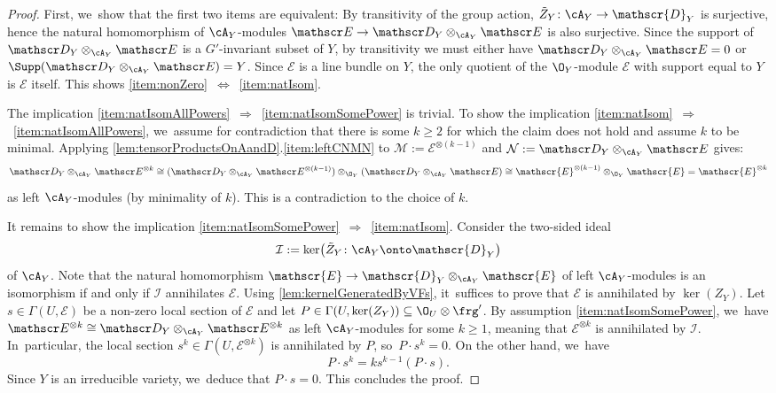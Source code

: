 \begin{proof}
First, we~show that the first two items are equivalent:
By transitivity of the group action, $\tilde Z_Y \colon \cA_Y \to \mathscr{D}_Y$ is surjective, hence the natural homomorphism of $\cA_Y$\nobreakdash-mod\-ules $\mathscr E \to \mathscr D_Y \otimes_{\cA_Y} \mathscr E$ is also surjective. Since the support of $\mathscr D_Y \otimes_{\cA_Y} \mathscr E$ is a $G'$-invariant subset of $Y$, by transitivity we must either have $\mathscr D_Y \otimes_{\cA_Y} \mathscr E = 0$ or $\Supp(\mathscr D_Y \otimes_{\cA_Y} \mathscr E) = Y$. Since $\mathscr E$ is a line bundle on $Y$, the only quotient of the $\O_Y$\nobreakdash-mod\-ule $\mathscr{E}$ with support equal to $Y$ is $\mathscr{E}$ itself. This shows \cref{item:nonZero}~$\Leftrightarrow$~\cref{item:natIsom}.

The implication \cref{item:natIsomAllPowers}~$\Rightarrow$~\cref{item:natIsomSomePower} is trivial. To show the implication \cref{item:natIsom}~$\Rightarrow$~\cref{item:natIsomAllPowers}, we~assume for contradiction that there is some $k \geq 2$ for which the claim does not hold and assume $k$ to be minimal. Applying \cref{lem:tensorProductsOnAandD}.\cref{item:leftCNMN} to $\mathcal M := \mathscr E^{\otimes (k-1)}$ and $\mathcal N := \mathscr D_Y \otimes_{\cA_Y} \mathscr E$ gives:
\[
\mathscr D_Y \otimes_{\cA_Y} \mathscr E^{\otimes k} \cong (\mathscr D_Y \otimes_{\cA_Y} \mathscr E^{\otimes (k-1)}) \otimes_{\O_Y} (\mathscr D_Y \otimes_{\cA_Y} \mathscr E) \cong \mathscr{E}^{\otimes (k-1)} \otimes_{\O_Y} \mathscr{E} = \mathscr{E}^{\otimes k}
\]
as left $\cA_Y$\nobreakdash-mod\-ules (by minimality of $k$). This is a contradiction to the choice of $k$.

It remains to show the implication \cref{item:natIsomSomePower}~$\Rightarrow$~\cref{item:natIsom}. Consider the two-sided ideal
\[
\mathcal I := \ker\bigl(\tilde Z_Y \colon \cA_Y \onto \mathscr{D}_Y\bigr)
\]
of $\cA_Y$.
Note that the natural homomorphism $\mathscr{E} \to \mathscr{D}_Y \otimes_{\cA_Y} \mathscr{E}$ of left $\cA_Y$\nobreakdash-mod\-ules is an isomorphism if and only if $\mathcal{I}$ annihilates $\mathscr{E}$. Using \cref{lem:kernelGeneratedByVFs}, it~suffices to prove that $\mathscr{E}$ is annihilated by $\ker(Z_Y)$. Let $s \in \Gamma(U,\mathscr{E})$ be a non-zero local section of $\mathscr{E}$ and let $P \in \Gamma(U,\ker(Z_Y)) \subseteq \O_U \otimes \frg'$.
By assumption \cref{item:natIsomSomePower}, we~have $\mathscr E^{\otimes k} \cong \mathscr D_Y \otimes_{\cA_Y} \mathscr E^{\otimes k}$ as left $\cA_Y$\nobreakdash-mod\-ules for some $k \geq 1$, meaning that $\mathscr{E}^{\otimes k}$ is annihilated by $\mathcal I$. In~particular, the local section $s^k \in \Gamma(U,\mathscr{E}^{\otimes k})$ is annihilated by $P$, so~$P \cdot s^k = 0$. On the other hand, we~have
\[
P \cdot s^k = k s^{k-1} (P \cdot s).
\]
Since $Y$ is an irreducible variety, we~deduce that $P \cdot s = 0$. This concludes the proof.
\end{proof}

